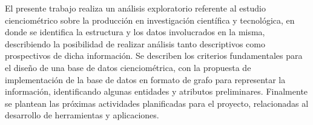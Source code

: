 El presente trabajo realiza un análisis exploratorio referente al  estudio cienciométrico sobre la producción en investigación científica y tecnológica, en donde se identifica la estructura y los datos involucrados en la misma, describiendo la posibilidad de realizar análisis tanto descriptivos como prospectivos de dicha información.
Se describen los criterios fundamentales para el diseño de una base de datos cienciométrica, con la propuesta de implementación de la base de datos en formato de grafo para representar la información, identificando algunas entidades y atributos preliminares. 
Finalmente se plantean las próximas actividades planificadas para el proyecto, relacionadas al desarrollo de herramientas y aplicaciones.

